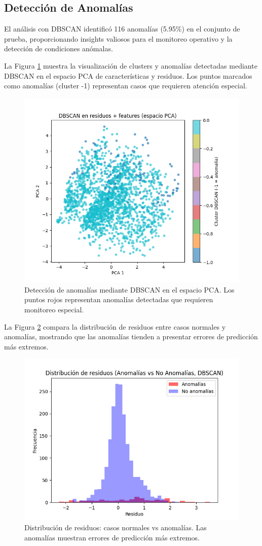\documentclass[conference]{IEEEtran}
\begin{document}
	\subsection{Detección de Anomalías}
	El análisis con DBSCAN identificó 116 anomalías (5.95\%) en el conjunto de prueba, proporcionando insights valiosos para el monitoreo operativo y la detección de condiciones anómalas.
	
	La Figura \ref{fig:dbscan_anomalias} muestra la visualización de clusters y anomalías detectadas mediante DBSCAN en el espacio PCA de características y residuos. Los puntos marcados como anomalías (cluster -1) representan casos que requieren atención especial.
	
	\begin{figure}[htbp]
		\centering
		\includegraphics[width=0.8\linewidth]{images/Figure_4.png}
		\caption{Detección de anomalías mediante DBSCAN en el espacio PCA. Los puntos rojos representan anomalías detectadas que requieren monitoreo especial.}
		\label{fig:dbscan_anomalias}
	\end{figure}
	
	La Figura \ref{fig:distribucion_residuos} compara la distribución de residuos entre casos normales y anomalías, mostrando que las anomalías tienden a presentar errores de predicción más extremos.
	
	\begin{figure}[htbp]
		\centering
		\includegraphics[width=0.7\linewidth]{images/Figure_5.png}
		\caption{Distribución de residuos: casos normales vs anomalías. Las anomalías muestran errores de predicción más extremos.}
		\label{fig:distribucion_residuos}
	\end{figure}
	
\end{document}
